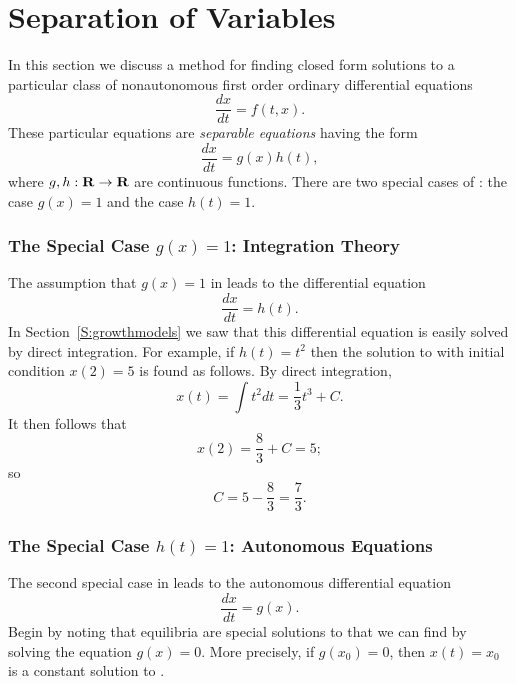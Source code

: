 \documentclass{ximera}
\begin{document}
\section{Separation of Variables}
\label{sec:sov} 

In this section we discuss a method for finding closed form solutions to
a particular class of nonautonomous first order ordinary differential 
equations 
\begin{equation}  \label{e:nonauto}
\frac{dx}{dt} = f(t,x).
\end{equation}
These particular equations are {\em separable equations\/} having the form 
\begin{equation}  \label{eq:gh}
\frac{dx}{dt} = g(x) h(t),
\end{equation}
where $g,h:\mbox{$\bf{R}$}\to\mbox{$\bf{R}$}$ are continuous functions.   There are two special cases 
of : the case $g(x)=1$ and the case $h(t)=1$.  

\subsubsection*{The Special Case $g(x)=1$: Integration Theory}

The assumption that $g(x)=1$ in  leads to the differential 
equation 
\begin{equation}  \label{e:g=1}
\frac{dx}{dt} = h(t).
\end{equation}
In Section~\ref{S:growthmodels} we saw that this differential equation  
is easily solved by direct integration.  For example, if $h(t)=t^2$ then 
the solution to  with initial condition $x(2)=5$ is found as
follows.  By direct integration,
\[
x(t) = \int t^2 dt = \frac{1}{3}t^3 + C.
\]
It then follows that
\[
x(2) = \frac{8}{3} + C = 5;
\]
so 
\[
C = 5 - \frac{8}{3} = \frac{7}{3}.
\]


\subsubsection*{The Special Case $h(t)=1$: Autonomous Equations}

The second special case in  leads to the autonomous 
differential equation
\begin{equation}  \label{e:h=1}
\frac{dx}{dt} = g(x).
\end{equation}
Begin by noting that equilibria are special solutions to  that we 
can find by solving the equation $g(x)=0$.  More precisely, if $g(x_0)=0$, 
then $x(t)=x_0$ is a constant solution to .  
\end{document}
